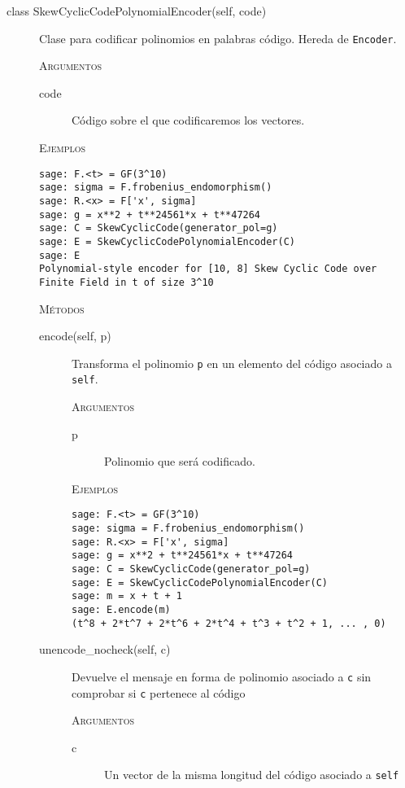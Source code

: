 \begin{description}
    \item[class SkewCyclicCodePolynomialEncoder(self, code)]
    Clase para codificar polinomios en palabras código. Hereda de \texttt{Encoder}.

    \textsc{Argumentos}
    \begin{description}
        \item[code]
        Código sobre el que codificaremos los vectores.
    \end{description}

    \textsc{Ejemplos}
    \begin{lstlisting}
sage: F.<t> = GF(3^10)
sage: sigma = F.frobenius_endomorphism()
sage: R.<x> = F['x', sigma]
sage: g = x**2 + t**24561*x + t**47264
sage: C = SkewCyclicCode(generator_pol=g)
sage: E = SkewCyclicCodePolynomialEncoder(C)
sage: E
Polynomial-style encoder for [10, 8] Skew Cyclic Code over Finite Field in t of size 3^10
    \end{lstlisting}

    \textsc{Métodos}
    \begin{description}
        \item[encode(self, p)]
        Transforma el polinomio \texttt{p} en un elemento del código asociado a \texttt{self}.

        \textsc{Argumentos}
        \begin{description}
            \item[p]
            Polinomio que será codificado.
        \end{description}

        \textsc{Ejemplos}
        \begin{lstlisting}
sage: F.<t> = GF(3^10)
sage: sigma = F.frobenius_endomorphism()
sage: R.<x> = F['x', sigma]
sage: g = x**2 + t**24561*x + t**47264
sage: C = SkewCyclicCode(generator_pol=g)
sage: E = SkewCyclicCodePolynomialEncoder(C)
sage: m = x + t + 1
sage: E.encode(m)
(t^8 + 2*t^7 + 2*t^6 + 2*t^4 + t^3 + t^2 + 1, ... , 0)
        \end{lstlisting}

        \item[unencode\_nocheck(self, c)]
        Devuelve el mensaje en forma de polinomio asociado a \texttt{c} sin comprobar si \texttt{c} pertenece al código

        \textsc{Argumentos}
        \begin{description}
            \item[c]
            Un vector de la misma longitud del código asociado a \texttt{self}
        \end{description}


\end{description}
\end{description}
